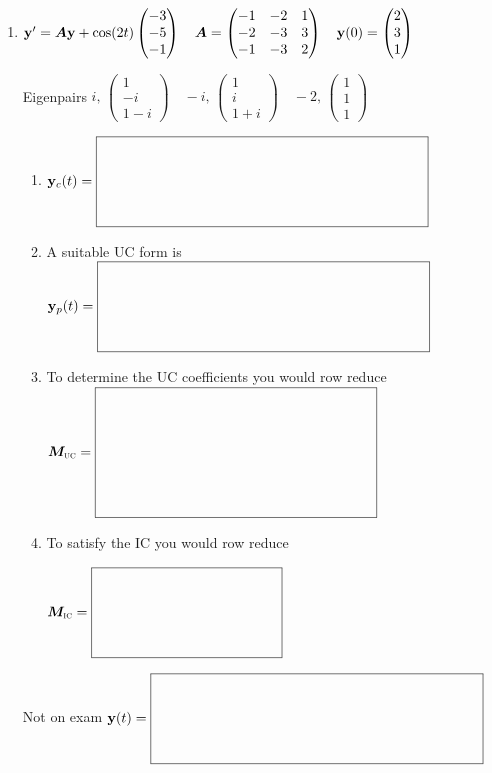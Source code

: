 \documentclass[12pt,letterpaper]{article}
\newcommand{\mat}[1]{\bm{#1}}
\newcommand{\SystemBlank}[2]{%
  \vcenter{\hbox{$\boxed{\rule{0pt}{#2}\makebox[#1]{}}$}}}
\newcommand{\VectorBlank}{\SystemBlank{3.2in}{0.80in}}
\newcommand{\MatrixBlank}{\SystemBlank{1.8in}{0.80in}}
\begin{document}
\begin{enumerate}
\newpage
\item
\begingroup\setlength{\arraycolsep}{3pt}
$\vect{y}'=\mat{A}\vect{y}+\cos(2t)\begin{pmatrix}-3\\-5\\-1\end{pmatrix}\quad \mat{A}=\begin{pmatrix}-1&-2&1\\-2&-3&3\\-1&-3&2\end{pmatrix}\quad \vect{y}(0)=\begin{pmatrix}2\\3\\1\end{pmatrix}$
\par Eigenpairs $i,\,\begin{pmatrix}1\\-i\\1-i\end{pmatrix}\quad -i,\,\begin{pmatrix}1\\i\\1+i\end{pmatrix}\quad -2,\,\begin{pmatrix}1\\1\\1\end{pmatrix}$
\endgroup
\begin{enumerate}
\item 
$\vect{y}_c(t)=\VectorBlank$
\item A suitable UC form is
\newline
$\vect{y}_p(t)=\VectorBlank$
\item To determine the UC coefficients 
you would row reduce \newline
$\mat{M}_{\text{\textsc{uc}}}=\SystemBlank{2.7in}{1.20in}$
\item To satisfy the IC you would row reduce
\par\noindent $\mat{M}_{\text{\textsc{ic}}}=\MatrixBlank$\par
\end{enumerate}
\vfill
Not on exam  $\vect{y}(t)=\VectorBlank$

\end{enumerate}
\end{document}
